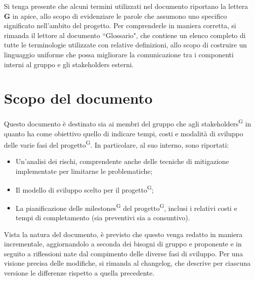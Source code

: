 \begin{beginningnote}
    Si tenga presente che alcuni termini utilizzati nel documento riportano la lettera \textbf{G} in apice, allo scopo di evidenziare le parole che assumono uno specifico significato nell'ambito del progetto. Per comprenderle in maniera corretta, si rimanda il lettore al documento ``Glossario", che contiene un elenco completo di tutte le terminologie utilizzate con relative definizioni, allo scopo di costruire un linguaggio uniforme che possa migliorare la comunicazione tra i componenti interni al gruppo e gli stakeholders esterni.   %
\end{beginningnote}

\section{Scopo del documento}\label{sec:scopo_del_documento}
Questo documento è destinato sia ai membri del gruppo che agli stakeholders\textsuperscript{G} in quanto ha come obiettivo quello di indicare tempi, costi e modalità di sviluppo delle varie fasi del progetto\textsuperscript{G}.
In particolare, al suo interno, sono riportati:
\begin{itemize}
    \item Un'analisi dei rischi, comprendente anche delle tecniche di mitigazione implementate per limitarne le problematiche;
    \item Il modello di sviluppo scelto per il progetto\textsuperscript{G};
    \item La pianificazione delle milestones\textsuperscript{G} del progetto\textsuperscript{G}, inclusi i relativi costi e tempi di completamento (sia preventivi sia a consuntivo).
\end{itemize}
Vista la natura del documento, è previsto che questo venga redatto in maniera incrementale, aggiornandolo a seconda dei bisogni di gruppo e proponente e in seguito a riflessioni nate dal compimento delle diverse fasi di sviluppo. Per una visione precisa delle modifiche, si rimanda al changelog, che descrive per ciascuna versione le differenze rispetto a quella precedente.

